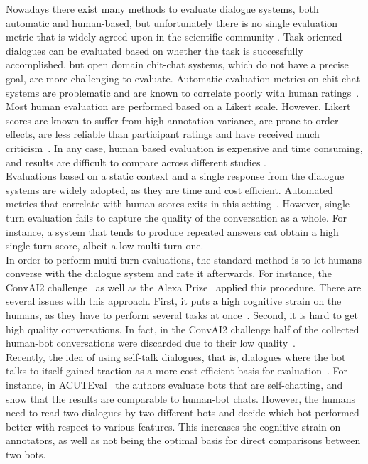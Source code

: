 \documentclass[11pt,a4paper]{article}
\begin{document}
Nowadays there exist many methods to evaluate dialogue systems, both automatic and human-based, but unfortunately there is no single evaluation metric that is widely agreed upon in the scientific community \cite{deriu2019survey}. Task oriented dialogues can be evaluated based on whether the task is successfully accomplished, but open domain chit-chat systems, which do not have a precise goal, are more challenging to evaluate. Automatic evaluation metrics on chit-chat systems are problematic and are known to correlate poorly with human ratings~\cite{liu-etal-2016-evaluate,lowe-etal-2017-towards}. \\
 Most human evaluation are performed based on a Likert scale. However, Likert scores are known to suffer from high annotation variance,  are prone to order effects, are less reliable than participant ratings and have received much criticism~\cite{amidei-etal-2019-use}. In any case, human based evaluation is expensive and time consuming, and results are difficult to compare across different studies \cite{van-der-lee-etal-2019-best,amidei2019agreement}. \\
 Evaluations based on a static context and a single response from the dialogue systems are widely adopted, as they are time and cost efficient. Automated metrics that correlate with human scores exits in this setting~\cite{lowe-etal-2017-towards,mehri2020usr}. However, single-turn evaluation fails to capture the quality of the conversation as a whole.  For instance, a system that tends to produce repeated answers cat obtain a high single-turn score, albeit a low multi-turn one. \\
  In order to perform multi-turn evaluations, the standard method is to let humans converse with the dialogue system and rate it afterwards. For instance, the ConvAI2 challenge~\cite{convai12} as well as the Alexa Prize~\cite{venkatesh2018evaluating} applied this procedure. There are several issues with this approach. First, it puts a high cognitive strain on the humans, as they have to perform several tasks at once~\cite{SCHMITT201512}. Second, it is hard to get high quality conversations. In fact, in the ConvAI2 challenge half of the collected human-bot conversations were discarded due to their low quality~\cite{convai12}. \\
 Recently, the idea of using self-talk dialogues, that is, dialogues where the bot talks to itself gained traction as a more cost efficient basis for evaluation~\cite{ghandeharioun2019approximating,li2019acuteeval,deriu-cieliebak-2019-towards}. For instance, in ACUTEval~\cite{li2019acuteeval} the authors evaluate bots that are self-chatting, and show that the results are comparable to human-bot chats. However, the humans need to read two dialogues by two different bots and decide which bot performed better with respect to various features. This increases the cognitive strain on annotators, as well as not being the optimal basis for direct comparisons between two bots. \\
\end{document}
